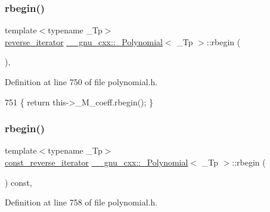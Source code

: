\subsubsection{\texorpdfstring{rbegin()}{rbegin()}\hspace{0.1cm}{\footnotesize\ttfamily [1/2]}}
{\footnotesize\ttfamily template$<$typename \+\_\+\+Tp$>$ \\
\hyperlink{class____gnu__cxx_1_1__Polynomial_aed8f7d97c575d5c34c54170631953415}{reverse\+\_\+iterator} \hyperlink{class____gnu__cxx_1_1__Polynomial}{\+\_\+\+\_\+gnu\+\_\+cxx\+::\+\_\+\+Polynomial}$<$ \+\_\+\+Tp $>$\+::rbegin (\begin{DoxyParamCaption}{ }\end{DoxyParamCaption})\hspace{0.3cm}{\ttfamily [inline]}, {\ttfamily [noexcept]}}



Definition at line 750 of file polynomial.\+h.


\begin{DoxyCode}
751       \{ \textcolor{keywordflow}{return} this->\_M\_coeff.rbegin(); \}
\end{DoxyCode}
\mbox{\label{class____gnu__cxx_1_1__Polynomial_ab5cd3c6e861ebf3adac38e3df4e099aa}} 
\subsubsection{\texorpdfstring{rbegin()}{rbegin()}\hspace{0.1cm}{\footnotesize\ttfamily [2/2]}}
{\footnotesize\ttfamily template$<$typename \+\_\+\+Tp$>$ \\
\hyperlink{class____gnu__cxx_1_1__Polynomial_a2a042a80127ab9a7b0349a54791e59af}{const\+\_\+reverse\+\_\+iterator} \hyperlink{class____gnu__cxx_1_1__Polynomial}{\+\_\+\+\_\+gnu\+\_\+cxx\+::\+\_\+\+Polynomial}$<$ \+\_\+\+Tp $>$\+::rbegin (\begin{DoxyParamCaption}{ }\end{DoxyParamCaption}) const\hspace{0.3cm}{\ttfamily [inline]}, {\ttfamily [noexcept]}}



Definition at line 758 of file polynomial.\+h.


